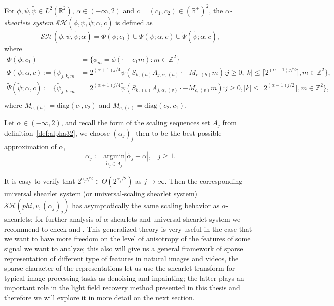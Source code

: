 \begin{defn}
\label{def:alphashearlets}
For $\phi,\psi,\tilde{\psi}\in L^2(\mathbb{R}^2)$, $\alpha\in (-\infty,2)$ and $c=(c_1,c_2)\in (\mathbb{R}^+)^2$, the \textit{$\alpha$-shearlets system} $\mathcal{SH}(\phi,\psi,\tilde{\psi};\alpha,c)$ is defined as
$$
\mathcal{SH}(\phi,\psi,\tilde{\psi};\alpha)=\Phi(\phi;c_1)\cup\Psi(\psi;\alpha,c)\cup\tilde{\Psi}(\tilde{\psi};\alpha,c),
$$
where
$$
\begin{aligned}
\Phi(\phi;c_1)&=\{\phi_m=\phi(\cdot-c_1m):m\in\mathbb{Z}^2\}\\
\Psi(\psi;\alpha,c):=\{\psi_{j,k,m}&=2^{(\alpha+1)j/4}\psi(S_{k,(h)}A_{j,\alpha,(h)}\cdot-M_{c,(h)}m)\textrm{:}j\geq 0,|k|\leq \lceil 2^{(\alpha-1)j/2}\rceil,m\in\mathbb{Z}^2\},\\
\tilde{\Psi}(\tilde{\psi};\alpha,c):=\{\tilde{\psi}_{j,k,m}&=2^{(\alpha+1)j/4}\tilde{\psi}(S_{k,(v)}A_{j,\alpha,(v)}\cdot-M_{c,(v)}m)\textrm{:}j\geq 0,|k|\leq \lceil 2^{(\alpha-1)j/2}\rceil,m\in\mathbb{Z}^2\},\\
\end{aligned}
$$
where $M_{c,(h)}=\text{diag}(c_1,c_2)$ and $M_{c,(v)}=\text{diag}(c_2,c_1)$.
\end{defn}

Let $\alpha\in (-\infty,2)$, and recall the form of the scaling sequences set $A_j$ from definition~\ref{def:alpha32}, we choose $(\alpha_j)_j$ then to be the best possible approximation of $\alpha$, 
$$
\alpha_j:=\underset{\tilde{\alpha}_j\in A_j}{\text{argmin}}|\tilde{\alpha}_j-\alpha|\textrm{,}\quad j\geq 1.
$$

It is easy to verify that $2^{\alpha_j j/2}\in\Theta(2^{\alpha_j/2})$ as $j\longrightarrow \infty$. Then the corresponding universal shearlet system (or universal-scaling shearlet system) $\mathcal{SH}(phi,v,(\alpha_j)_j)$ has asymptotically the same scaling behavior as $\alpha$-shearlets; for further analysis of $\alpha$-shearlets and universal shearlet system we recommend to check \cite{Gitta-alpha} and \cite{firstalpha}. This generalized theory is very useful in the case that we want to have more freedom on the level of anisotropy of the features of some signal we want to analyze; this also will give us a general framework of sparse representation of different type of features in natural images and videos, the sparse character of the representations let us use the shearlet transform for typical image processing tasks as denoising and inpainting; the latter plays an important role in the light field recovery method presented in this thesis and therefore we will explore it in more detail on the next section.

